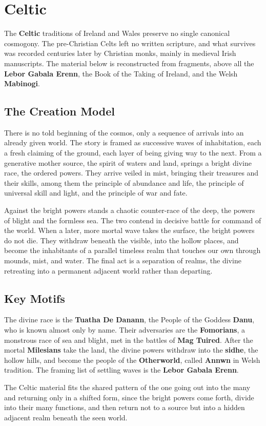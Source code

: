 \section{Celtic}

The \textbf{Celtic} traditions of Ireland and Wales preserve no single canonical cosmogony. The pre-Christian Celts left no written scripture, and what survives was recorded centuries later by Christian monks, mainly in medieval Irish manuscripts. The material below is reconstructed from fragments, above all the \textbf{Lebor Gabala Erenn}, the Book of the Taking of Ireland, and the Welsh \textbf{Mabinogi}.

\subsection{The Creation Model}

There is no told beginning of the cosmos, only a sequence of arrivals into an already given world. The story is framed as successive waves of inhabitation, each a fresh claiming of the ground, each layer of being giving way to the next. From a generative mother source, the spirit of waters and land, springs a bright divine race, the ordered powers. They arrive veiled in mist, bringing their treasures and their skills, among them the principle of abundance and life, the principle of universal skill and light, and the principle of war and fate.

Against the bright powers stands a chaotic counter-race of the deep, the powers of blight and the formless sea. The two contend in decisive battle for command of the world. When a later, more mortal wave takes the surface, the bright powers do not die. They withdraw beneath the visible, into the hollow places, and become the inhabitants of a parallel timeless realm that touches our own through mounds, mist, and water. The final act is a separation of realms, the divine retreating into a permanent adjacent world rather than departing.

\subsection{Key Motifs}

The divine race is the \textbf{Tuatha De Danann}, the People of the Goddess \textbf{Danu}, who is known almost only by name. Their adversaries are the \textbf{Fomorians}, a monstrous race of sea and blight, met in the battles of \textbf{Mag Tuired}. After the mortal \textbf{Milesians} take the land, the divine powers withdraw into the \textbf{sidhe}, the hollow hills, and become the people of the \textbf{Otherworld}, called \textbf{Annwn} in Welsh tradition. The framing list of settling waves is the \textbf{Lebor Gabala Erenn}.

The Celtic material fits the shared pattern of the one going out into the many and returning only in a shifted form, since the bright powers come forth, divide into their many functions, and then return not to a source but into a hidden adjacent realm beneath the seen world.
